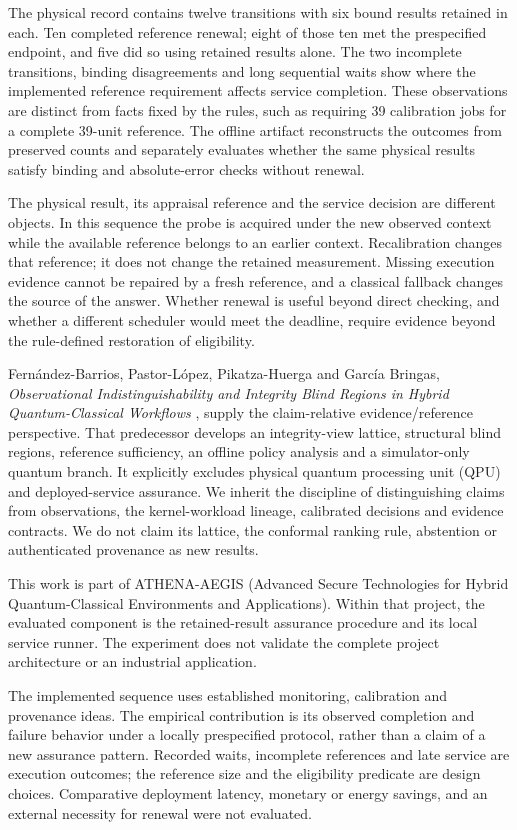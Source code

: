 \documentclass[pdflatex,sn-mathphys-num]{sn-jnl}
\begin{document}
The physical record contains twelve transitions with six bound results retained in each. Ten completed reference renewal; eight of those ten met the prespecified endpoint, and five did so using retained results alone. The two incomplete transitions, binding disagreements and long sequential waits show where the implemented reference requirement affects service completion. These observations are distinct from facts fixed by the rules, such as requiring 39 calibration jobs for a complete 39-unit reference. The offline artifact reconstructs the outcomes from preserved counts and separately evaluates whether the same physical results satisfy binding and absolute-error checks without renewal.

The physical result, its appraisal reference and the service decision are different objects. In this sequence the probe is acquired under the new observed context while the available reference belongs to an earlier context. Recalibration changes that reference; it does not change the retained measurement. Missing execution evidence cannot be repaired by a fresh reference, and a classical fallback changes the source of the answer. Whether renewal is useful beyond direct checking, and whether a different scheduler would meet the deadline, require evidence beyond the rule-defined restoration of eligibility.

Fernández-Barrios, Pastor-López, Pikatza-Huerga and García Bringas, \emph{Observational Indistinguishability and Integrity Blind Regions in Hybrid Quantum-Classical Workflows} \cite{fernandez2026observational}, supply the claim-relative evidence/reference perspective. That predecessor develops an integrity-view lattice, structural blind regions, reference sufficiency, an offline policy analysis and a simulator-only quantum branch. It explicitly excludes physical quantum processing unit (QPU) and deployed-service assurance. We inherit the discipline of distinguishing claims from observations, the kernel-workload lineage, calibrated decisions and evidence contracts. We do not claim its lattice, the conformal ranking rule, abstention or authenticated provenance as new results.

This work is part of ATHENA-AEGIS (Advanced Secure Technologies for Hybrid Quantum-Classical Environments and Applications). Within that project, the evaluated component is the retained-result assurance procedure and its local service runner. The experiment does not validate the complete project architecture or an industrial application.

The implemented sequence uses established monitoring, calibration and provenance ideas. The empirical contribution is its observed completion and failure behavior under a locally prespecified protocol, rather than a claim of a new assurance pattern. Recorded waits, incomplete references and late service are execution outcomes; the reference size and the eligibility predicate are design choices. Comparative deployment latency, monetary or energy savings, and an external necessity for renewal were not evaluated.
\end{document}
